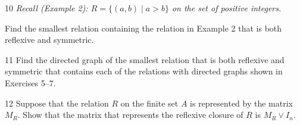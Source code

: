 \documentclass[11pt]{article}
\begin{document}
\begin{exercise}{10}
    \textit{Recall (Example 2): $R = \{(a,b) \mid a > b\}$ on the set
    of positive integers.}

    Find the smallest relation containing the relation in Example 2
    that is both reflexive and symmetric.
\end{exercise}

\begin{exercise}{11}
    Find the directed graph of the smallest relation that is both
    reflexive and symmetric that contains each of the relations with
    directed graphs shown in Exercises 5--7.
\end{exercise}

\begin{exercise}{12}
    Suppose that the relation $R$ on the finite set $A$ is represented
    by the matrix $M_R$. Show that the matrix that represents the
    reflexive closure of $R$ is $M_R \vee I_n$.
\end{exercise}
\end{document}
